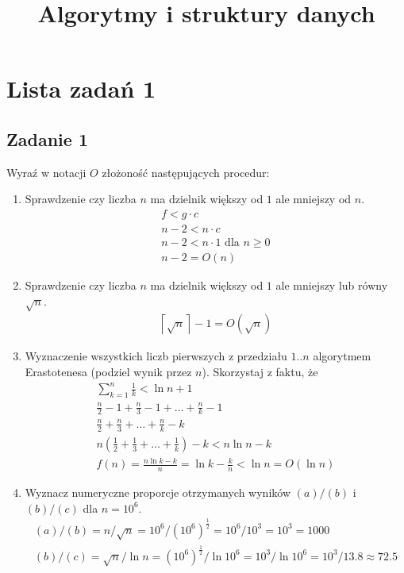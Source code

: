 \documentclass{article}
\begin{document}
\title{Algorytmy i struktury danych}
\author{}
\date{}
\maketitle

\section*{Lista zadań 1}

\subsection*{Zadanie 1}
Wyraź w notacji $O$ złożoność następujących procedur:
\begin{enumerate}[label=(\alph*)]
    \item Sprawdzenie czy liczba $n$ ma dzielnik większy od $1$ ale mniejszy od $n$.
          \begin{gather*}
              f < g \cdot c \\
              n-2 < n \cdot c \\
              n-2 < n \cdot 1 \text{ dla }n \geq 0 \\
              n-2 = O(n)
          \end{gather*}
    \item Sprawdzenie czy liczba $n$ ma dzielnik większy od $1$ ale mniejszy lub równy $\sqrt{n}$.
          \begin{gather*}
              \left \lceil {\sqrt{n}} \right \rceil - 1 = O(\sqrt{n})
          \end{gather*}
    \item Wyznaczenie wszystkich liczb pierwszych z przedziału $1..n$ algorytmem Erastotenesa
          (podziel wynik przez $n$). Skorzystaj z faktu, że
          \begin{gather*}
              \sum_{k=1}^{n} \frac{1}{k} < \ln n + 1 \\
              \frac{n}{2}-1 + \frac{n}{3}-1 + \dots + \frac{n}{k}-1 \\
              \frac{n}{2} + \frac{n}{3} + \dots + \frac{n}{k} - k \\
              n\left(\frac{1}{2} + \frac{1}{3} + \dots + \frac{1}{k}\right) - k < n \ln n - k \\
              f(n)=\frac{n \ln k - k}{n} = \ln k - \frac{k}{n} < \ln n = O(\ln n)
          \end{gather*}
    \item Wyznacz numeryczne proporcje otrzymanych wyników $(a)/(b)$ i $(b)/(c)$ dla $n = 10^6$.
          \begin{gather*}
              (a)/(b) = n/\sqrt{n} = 10^6/\left(10^6\right)^\frac{1}{2} = 10^6/10^3 = 10^3 = 1000 \\
              (b)/(c) = \sqrt{n}/\ln n = \left(10^6\right)^\frac{1}{2}/\ln 10^6 = 10^3/\ln 10^6 = 10^3/13.8 \approx 72.5
          \end{gather*}
\end{enumerate}
\end{document}
